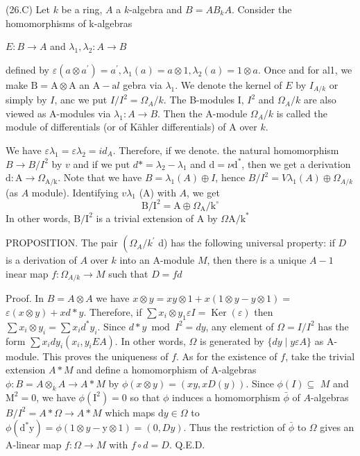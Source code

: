 (26.C) Let $k$ be a ring, $A$ a $k$-algebra and $B=A B_{k} A$. Consider the homomorphisms of k-algebras

$E: B \rightarrow A$ and $\lambda_{1}, \lambda_{2}: A \rightarrow B$

defined by $\varepsilon\left(a \otimes a^{\prime}\right)=a^{\prime}, \lambda_{1}(a)=a \otimes 1, \lambda_{2}(a)=1 \otimes a$. Once and for al1, we make $\mathrm{B}=\mathrm{A} \otimes \mathrm{A}$ an $\mathrm{A}-\mathrm{a} l$ gebra via $\lambda_{1}$. We denote the kernel of $E$ by $I_{A / k}$ or simply by $I$, anc we put $I / I^{2}=\Omega_{A} / k$. The B-modules I, $I^{2}$ and $\Omega_{A} / k$ are also viewed as A-modules via $\lambda_{1}: A \rightarrow B$. Then the A-module $\Omega_{A} / k$ is called the module of differentials (or of Kähler differentials) of A over $k$.

We have $\varepsilon \lambda_{1}=\varepsilon \lambda_{2}=i d_{A}$. Therefore, if we denote. the natural homomorphism $B \rightarrow B / I^{2}$ by $v$ and if we put $d *=\lambda_{2}-\lambda_{1}$ and $\mathrm{d}=\nu \mathrm{d}^{*}$, then we get a derivation $\mathrm{d}: \mathrm{A} \rightarrow \Omega_{\mathrm{A} / \mathrm{k}}$. Note that we have $B=\lambda_{1}(A) \oplus I$, hence $B / I^{2}=V \lambda_{1}(A) \oplus \Omega_{A / k}$ (as $A$ module). Identifying $v \lambda_{1}$ (A) with $A$, we get
$$
\mathrm{B} / \mathrm{I}^{2}=\mathrm{A} \oplus \Omega_{\mathrm{A}} / \mathrm{k}^{\circ}
$$
In other words, $\mathrm{B} / \mathrm{I}^{2}$ is a trivial extension of $\mathrm{A}$ by $\Omega \mathrm{A} / \mathrm{k}^{\text {* }}$

PROPOSITION. The pair $\left(\Omega_{A} / k^{\prime}\right.$ d) has the following universal property: if $D$ is a derivation of $A$ over $k$ into an A-module $M$, then there is a unique $A-1$ inear map $f: \Omega_{A / k} \rightarrow M$ such that $D=f d$

Proof. In $B=A \otimes A$ we have $x \otimes y=x y \otimes 1+x(1 \otimes y-y \otimes 1)=$ $\varepsilon(x \otimes y)+x d * y$. Therefore, if $\sum x_{i} \otimes y_{1} \varepsilon I=\operatorname{Ker}(\varepsilon)$ then $\sum x_{i} \otimes y_{i}=\sum x_{i} d^{*} y_{i}$. Since $d * y \bmod I^{2}=d y$, any element of $\Omega=I / I^{2}$ has the form $\sum x_{i} d y_{i}\left(x_{i}, y_{i} E A\right)$. In other words, $\Omega$ is generated by $\{d y \mid y \varepsilon A\}$ as A-module. This proves the uniqueness of $f$. As for the existence of $f$, take the trivial extension $A * M$ and define a homomorphism of A-algebras $\phi: B=A \otimes_{k} A \rightarrow A * M$ by $\phi(x \otimes y)=(x y, x D(y))$. Since $\phi(I) \subseteq$ $M$ and $\mathrm{M}^{2}=0$, we have $\phi\left(\mathrm{I}^{2}\right)=0$ so that $\phi$ induces a homomorphism $\bar{\phi}$ of $A$-algebras $B / I^{2}=A * \Omega \rightarrow A * M$ which maps $\mathrm{d} y \in \Omega$ to $\phi\left(\mathrm{d}^{*} \mathrm{y}\right)=\phi(1 \otimes y-\mathrm{y} \otimes 1)=(0, D y)$. Thus the restriction of $\bar{\phi}$ to $\Omega$ gives an A-linear map $f: \Omega \rightarrow M$ with $f \circ d=D$. Q.E.D.

